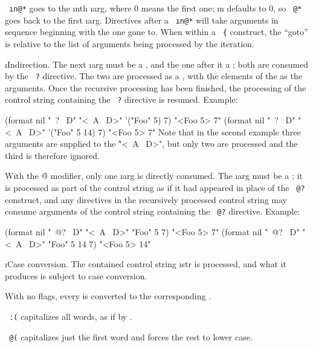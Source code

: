 {\tt ~\i{n}@*} 
goes to the \i{n}th \i{arg}, where 0 means the first one;
\i{n} defaults to 0, so {\tt ~@*} goes back to the first \i{arg}.      
Directives after a {\tt ~\i{n}@*}
will take arguments in sequence beginning with the one gone to.
When within a {\tt ~\{} construct, the ``goto''
is relative to the list of arguments being processed by the iteration.


\i{Indirection}.
The next \i{arg} must be a , and the one after it a ;
both are consumed by the {\tt ~?} directive.
The two are processed as a , with the elements of the  
as the arguments.  Once the recursive processing
has been finished, the processing of the control
string containing the {\tt ~?} directive is resumed.
Example:

\code
 (format nil "~? ~D" "<~A ~D>" '("Foo" 5) 7) \EV "<Foo 5> 7"
 (format nil "~? ~D" "<~A ~D>" '("Foo" 5 14) 7) \EV "<Foo 5> 7"
\endcode
Note that in the second example three arguments are supplied
to the  \f{"<~A ~D>"}, but only two are processed
and the third is therefore ignored.

With the \f{@}
modifier, only one \i{arg} is directly consumed.
The \i{arg} must be a ; 
it is processed as part of the control
string as if it had appeared in place of the {\tt ~@?} construct,
and any directives in the recursively processed control string may      
consume arguments of the control string containing the {\tt ~@?}
directive.
Example:

\code
 (format nil "~@? ~D" "<~A ~D>" "Foo" 5 7) \EV "<Foo 5> 7"
 (format nil "~@? ~D" "<~A ~D>" "Foo" 5 14 7) \EV "<Foo 5> 14"
\endcode


\i{Case conversion}.
The contained control string \i{str} is processed, and what it produces
is subject to case conversion.

With no flags, every  
is converted to the corresponding  .

{\tt ~:(} capitalizes all words, as if by .
                        
{\tt ~@(} 
capitalizes just the first word and forces the rest to lower
case.

